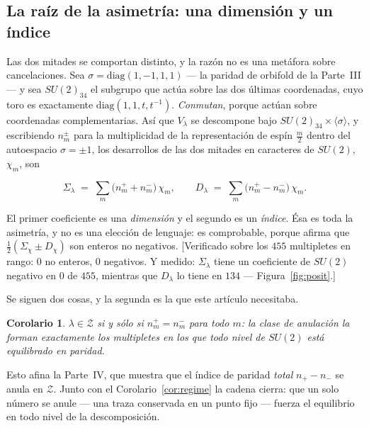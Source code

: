 \documentclass[11pt,a4paper]{article}
\newtheorem{corollary}{Corolario}
\newcommand{\Sig}{\Sigma_\lambda}
\newcommand{\Dl}{D_\lambda}
\newenvironment{keyeq}
  {\begin{center}\setlength{\fboxsep}{9pt}\setlength{\fboxrule}{0.8pt}%
   \begin{lrbox}{\keyeqbox}\begin{minipage}{0.88\textwidth}}
  {\end{minipage}\end{lrbox}%
   \fcolorbox{hdrblue!55}{hdrblue!6}{\usebox{\keyeqbox}}\end{center}}
\begin{document}
\subsection*{La raíz de la asimetría: una dimensión y un índice}

Las dos mitades se comportan distinto, y la razón no es una metáfora sobre cancelaciones. Sea
$\sigma=\mathrm{diag}(1,-1,1,1)$ --- la paridad de orbifold de la Parte~III --- y sea $SU(2)_{34}$ el
subgrupo que actúa sobre las dos últimas coordenadas, cuyo toro es exactamente
$\mathrm{diag}(1,1,t,t^{-1})$. \emph{Conmutan}, porque actúan sobre coordenadas complementarias. Así
que $V_\lambda$ se descompone bajo $SU(2)_{34}\times\langle\sigma\rangle$, y escribiendo $n^\pm_m$
para la multiplicidad de la representación de espín $\tfrac m2$ dentro del autoespacio $\sigma=\pm1$,
los desarrollos de las dos mitades en caracteres de $SU(2)$, $\chi_m$, son

\begin{keyeq}
\begin{equation}\label{eq:dimindex}
\Sig \;=\; \sum_m \big(n^+_m+n^-_m\big)\,\chi_m ,
\qquad
\Dl \;=\; \sum_m \big(n^+_m-n^-_m\big)\,\chi_m .
\end{equation}
\end{keyeq}

\noindent El primer coeficiente es una \emph{dimensión} y el segundo es un \emph{índice}. Ésa es toda
la asimetría, y no es una elección de lenguaje: es comprobable, porque afirma que
$\tfrac12(\Sigma_\chi\pm D_\chi)$ son enteros no negativos. [Verificado sobre los $455$ multipletes en
rango: $0$ no enteros, $0$ negativos. Y medido: $\Sig$ tiene un coeficiente de $SU(2)$ negativo en
$0$ de $455$, mientras que $\Dl$ lo tiene en $134$ --- Figura~\ref{fig:posit}.]

Se siguen dos cosas, y la segunda es la que este artículo necesitaba.

\begin{corollary}\label{cor:balance}
$\lambda\in\mathcal Z$ si y sólo si $n^+_m=n^-_m$ para \emph{todo} $m$: la clase de anulación la
forman exactamente los multipletes en los que todo nivel de $SU(2)$ está equilibrado en paridad.
\end{corollary}

 Esto
afina la Parte~IV, que muestra que el índice de paridad \emph{total} $n_+-n_-$ se anula en
$\mathcal Z$. Junto con el Corolario~\ref{cor:regime} la cadena cierra: que un solo número se anule
--- una traza conservada en un punto fijo --- fuerza el equilibrio en todo nivel de la descomposición.
\end{document}

